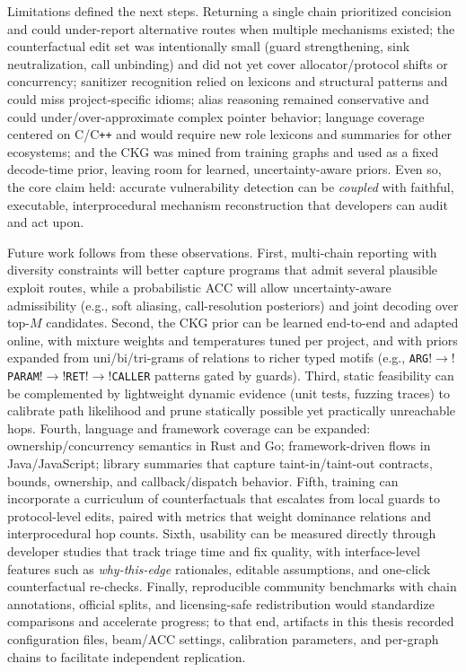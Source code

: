 \documentclass{buthesis}
\begin{document}
Limitations defined the next steps. Returning a single chain prioritized concision and could under-report alternative routes when multiple mechanisms existed; the counterfactual edit set was intentionally small (guard strengthening, sink neutralization, call unbinding) and did not yet cover allocator/protocol shifts or concurrency; sanitizer recognition relied on lexicons and structural patterns and could miss project-specific idioms; alias reasoning remained conservative and could under/over-approximate complex pointer behavior; language coverage centered on C/C\texttt{++} and would require new role lexicons and summaries for other ecosystems; and the CKG was mined from training graphs and used as a fixed decode-time prior, leaving room for learned, uncertainty-aware priors. Even so, the core claim held: accurate vulnerability detection can be \emph{coupled} with faithful, executable, interprocedural mechanism reconstruction that developers can audit and act upon.

Future work follows from these observations. First, multi-chain reporting with diversity constraints will better capture programs that admit several plausible exploit routes, while a probabilistic ACC will allow uncertainty-aware admissibility (e.g., soft aliasing, call-resolution posteriors) and joint decoding over top-$M$ candidates. Second, the CKG prior can be learned end-to-end and adapted online, with mixture weights and temperatures tuned per project, and with priors expanded from uni/bi/tri-grams of relations to richer typed motifs (e.g., \texttt{ARG}$!\to!$\texttt{PARAM}$!\to!$\texttt{RET}$!\to!$\texttt{CALLER} patterns gated by guards). Third, static feasibility can be complemented by lightweight dynamic evidence (unit tests, fuzzing traces) to calibrate path likelihood and prune statically possible yet practically unreachable hops. Fourth, language and framework coverage can be expanded: ownership/concurrency semantics in Rust and Go; framework-driven flows in Java/JavaScript; library summaries that capture taint-in/taint-out contracts, bounds, ownership, and callback/dispatch behavior. Fifth, training can incorporate a curriculum of counterfactuals that escalates from local guards to protocol-level edits, paired with metrics that weight dominance relations and interprocedural hop counts. Sixth, usability can be measured directly through developer studies that track triage time and fix quality, with interface-level features such as \emph{why-this-edge} rationales, editable assumptions, and one-click counterfactual re-checks. Finally, reproducible community benchmarks with chain annotations, official splits, and licensing-safe redistribution would standardize comparisons and accelerate progress; to that end, artifacts in this thesis recorded configuration files, beam/ACC settings, calibration parameters, and per-graph chains to facilitate independent replication.
\end{document}
